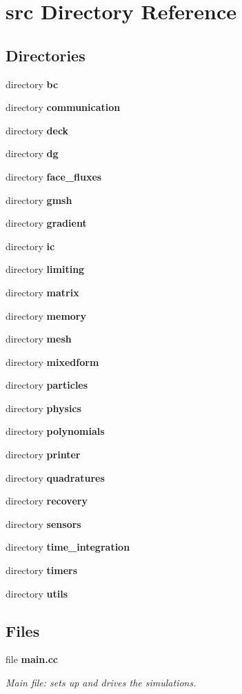 \section{src Directory Reference}
\label{dir_68267d1309a1af8e8297ef4c3efbcdba}
\subsection*{Directories}
\begin{DoxyCompactItemize}
\item 
directory {\bf bc}
\item 
directory {\bf communication}
\item 
directory {\bf deck}
\item 
directory {\bf dg}
\item 
directory {\bf face\-\_\-fluxes}
\item 
directory {\bf gmsh}
\item 
directory {\bf gradient}
\item 
directory {\bf ic}
\item 
directory {\bf limiting}
\item 
directory {\bf matrix}
\item 
directory {\bf memory}
\item 
directory {\bf mesh}
\item 
directory {\bf mixedform}
\item 
directory {\bf particles}
\item 
directory {\bf physics}
\item 
directory {\bf polynomials}
\item 
directory {\bf printer}
\item 
directory {\bf quadratures}
\item 
directory {\bf recovery}
\item 
directory {\bf sensors}
\item 
directory {\bf time\-\_\-integration}
\item 
directory {\bf timers}
\item 
directory {\bf utils}
\end{DoxyCompactItemize}
\subsection*{Files}
\begin{DoxyCompactItemize}
\item 
file {\bf main.\-cc}
\begin{DoxyCompactList}\small\item\em Main file\-: sets up and drives the simulations. \end{DoxyCompactList}\end{DoxyCompactItemize}
